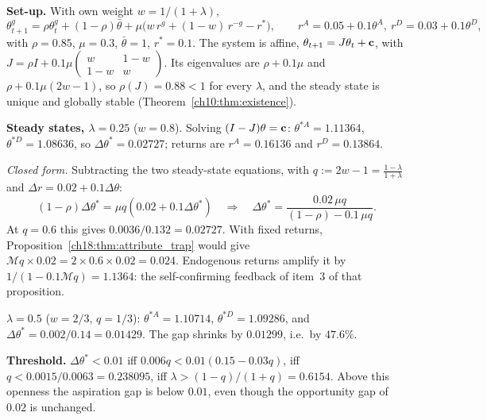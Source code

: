 \documentclass[../solutions_manual.tex]{subfiles}
\begin{document}

 \textbf{Set-up.} With own weight $w = 1/(1+\lambda)$,
\[
\theta^g_{t+1} = \rho\theta^g_t + (1-\rho)\bar\theta + \mu\big(w\,r^g + (1-w)\,r^{-g} - r^*\big),\qquad r^A = 0.05 + 0.1\theta^A,\ r^D = 0.03 + 0.1\theta^D,
\]
with $\rho = 0.85$, $\mu = 0.3$, $\bar\theta = 1$, $r^* = 0.1$. The system is affine, $\theta_{t+1} = J\theta_t + \mathbf{c}$, with $J = \rho I + 0.1\mu\begin{pmatrix}w & 1-w\\ 1-w & w\end{pmatrix}$. Its eigenvalues are $\rho + 0.1\mu$ and $\rho + 0.1\mu(2w-1)$, so $\rho(J) = 0.88 < 1$ for every $\lambda$, and the steady state is unique and globally stable (Theorem~\ref{ch10:thm:existence}).

 \textbf{Steady states, $\lambda = 0.25$} ($w = 0.8$). Solving $(I - J)\theta = \mathbf{c}$: $\theta^{*A} = 1.11364$, $\theta^{*D} = 1.08636$, so $\Delta\theta^* = 0.02727$; returns are $r^A = 0.16136$ and $r^D = 0.13864$.

\emph{Closed form.} Subtracting the two steady-state equations, with $q := 2w - 1 = \frac{1-\lambda}{1+\lambda}$ and $\Delta r = 0.02 + 0.1\Delta\theta$:
\[
(1-\rho)\Delta\theta^* = \mu q(0.02 + 0.1\Delta\theta^*) \quad\Longrightarrow\quad \Delta\theta^* = \frac{0.02\,\mu q}{(1-\rho) - 0.1\,\mu q}.
\]
At $q = 0.6$ this gives $0.0036/0.132 = 0.02727$. With fixed returns, Proposition~\ref{ch18:thm:attribute_trap} would give $\mathcal{M}q \times 0.02 = 2 \times 0.6 \times 0.02 = 0.024$. Endogenous returns amplify it by $1/(1 - 0.1\mathcal{M}q) = 1.1364$: the self-confirming feedback of item~3 of that proposition.

 \textbf{$\lambda = 0.5$} ($w = 2/3$, $q = 1/3$): $\theta^{*A} = 1.10714$, $\theta^{*D} = 1.09286$, and $\Delta\theta^* = 0.002/0.14 = 0.01429$. The gap shrinks by $0.01299$, i.e.\ by $47.6\%$.

 \textbf{Threshold.} $\Delta\theta^* < 0.01$ iff $0.006q < 0.01(0.15 - 0.03q)$, iff $q < 0.0015/0.0063 = 0.238095$, iff $\lambda > (1-q)/(1+q) = 0.6154$. Above this openness the aspiration gap is below $0.01$, even though the opportunity gap of $0.02$ is unchanged.
\end{document}
